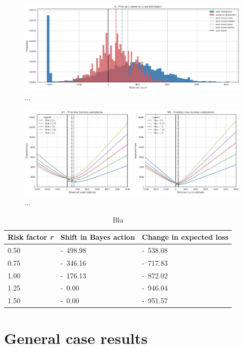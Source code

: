 	\begin{figure}[h]
			\centering
			\includegraphics[width=1\textwidth]{Figures/update_smallres2.png}
			\caption{...}\label{fig:update_smallres2} 
	\end{figure}
	
	\begin{figure}[h]
				\centering
				\includegraphics[width=1\textwidth]{Figures/update_smallres3.png}
				\caption{...}\label{fig:update_smallres3} 
	\end{figure}
			
	\begin{table}
		\centering
		\begin{tabular}[c]{| l | l | l |}
			\hline
			Risk factor \textit{r} & Shift in Bayes action & Change in expected loss \\ \hline
			0.50 & -~498.98 & -~538.08 \\ 
			0.75 & -~346.16 & -~717.83  \\ 
			1.00 & -~176.13 & -~872.02 \\ 
			1.25 & -~0.00 & -~946.04 \\ 
			1.50 & -~0.00 & -~951.57  \\ 
			\hline
		\end{tabular}
		\caption{Bla}
		\label{tab:update_smallres_tab}
	\end{table}
		
	\section{General case results}